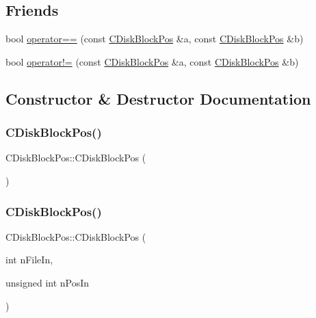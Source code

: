 \subsection*{Friends}
\begin{DoxyCompactItemize}
\item 
bool \mbox{\hyperlink{struct_c_disk_block_pos_a04787eb60da48b80e0f7fb402c6896fe}{operator==}} (const \mbox{\hyperlink{struct_c_disk_block_pos}{C\+Disk\+Block\+Pos}} \&a, const \mbox{\hyperlink{struct_c_disk_block_pos}{C\+Disk\+Block\+Pos}} \&b)
\item 
bool \mbox{\hyperlink{struct_c_disk_block_pos_af77481af6cf1d32788ba67c29cc061b5}{operator!=}} (const \mbox{\hyperlink{struct_c_disk_block_pos}{C\+Disk\+Block\+Pos}} \&a, const \mbox{\hyperlink{struct_c_disk_block_pos}{C\+Disk\+Block\+Pos}} \&b)
\end{DoxyCompactItemize}


\subsection{Constructor \& Destructor Documentation}
\mbox{\label{struct_c_disk_block_pos_ac34e46c8bf3256b3eca09f54911cf8bd}} 
\subsubsection{\texorpdfstring{C\+Disk\+Block\+Pos()}{CDiskBlockPos()}\hspace{0.1cm}{\footnotesize\ttfamily [1/2]}}
{\footnotesize\ttfamily C\+Disk\+Block\+Pos\+::\+C\+Disk\+Block\+Pos (\begin{DoxyParamCaption}{ }\end{DoxyParamCaption})\hspace{0.3cm}{\ttfamily [inline]}}

\mbox{\label{struct_c_disk_block_pos_a0c96947d09bb4aaf28ab2d7866d20918}} 
\subsubsection{\texorpdfstring{C\+Disk\+Block\+Pos()}{CDiskBlockPos()}\hspace{0.1cm}{\footnotesize\ttfamily [2/2]}}
{\footnotesize\ttfamily C\+Disk\+Block\+Pos\+::\+C\+Disk\+Block\+Pos (\begin{DoxyParamCaption}\item[{int}]{n\+File\+In,  }\item[{unsigned int}]{n\+Pos\+In }\end{DoxyParamCaption})\hspace{0.3cm}{\ttfamily [inline]}}




